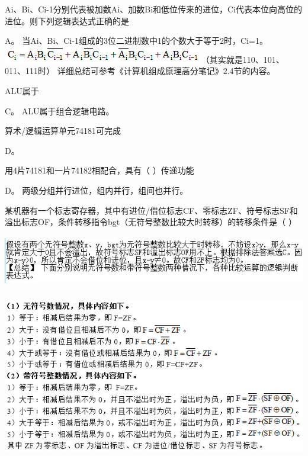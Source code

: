 \question Ai、Bi、Ci-1分别代表被加数Ai、加数Bi和低位传来的进位，Ci代表本位向高位的进位。则下列逻辑表达式正确的是
\par\fourch{\textcolor{red}{}}{}{}{}
\begin{solution}A。 当Ai、Bi、Ci-1组成的3位二进制数中1的个数大于等于2时，Ci=1。
\includegraphics[width=3.40625in,height=0.28125in]{computerassets/ab8641fde06fc5054ca6997de268bf43.jpeg}
（其实就是110、101、011、111时）
详细总结可参考《计算机组成原理高分笔记》2.4节的内容。
\end{solution}
\question ALU属于
\par{}
\begin{solution}C。 ALU属于组合逻辑电路。
\end{solution}
\question 算术/逻辑运算单元74181可完成
\par{}
\begin{solution}D。
\end{solution}
\question 用4片74181和一片74182相配合，具有（ ）传递功能
\par{}
\begin{solution}D。 两级分组并行进位，组内并行，组间也并行。
\end{solution}
\question 某机器有一个标志寄存器，其中有进位/借位标志CF、零标志ZF、符号标志SF和溢出标志OF，条件转移指令bgt（无符号整数比较大时转移）的转移条件是（
）
\par\fourch{}{}{\textcolor{red}{}}{}
\begin{solution}\includegraphics[width=5.72917in,height=0.86458in]{computerassets/74EF34BCDCBB2EFCE7D844D3089A1667.jpg}
\includegraphics[width=6.15625in,height=3.10417in]{computerassets/b2a998cc87dd3475e9efee2910f922bf.jpeg}
\end{solution}
